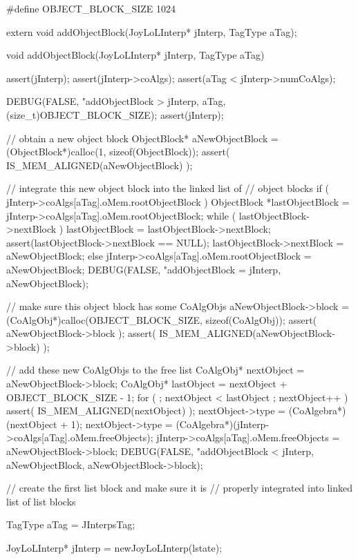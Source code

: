 \startCHeader
#define OBJECT_BLOCK_SIZE 1024

extern void addObjectBlock(JoyLoLInterp* jInterp, TagType aTag);
\stopCHeader


\startCCode
void addObjectBlock(JoyLoLInterp* jInterp, TagType aTag) {
  assert(jInterp);
  assert(jInterp->coAlgs);
  assert(aTag < jInterp->numCoAlgs);

  DEBUG(FALSE, "addObjectBlock > %
    jInterp, aTag, (size_t)OBJECT_BLOCK_SIZE);
  assert(jInterp);
  
  // obtain a new object block
  ObjectBlock* aNewObjectBlock = 
    (ObjectBlock*)calloc(1, sizeof(ObjectBlock));
  assert( IS_MEM_ALIGNED(aNewObjectBlock) );

  // integrate this new object block into the linked list of
  // object blocks
  if ( jInterp->coAlgs[aTag].oMem.rootObjectBlock ) {
    ObjectBlock *lastObjectBlock = jInterp->coAlgs[aTag].oMem.rootObjectBlock;
    while ( lastObjectBlock->nextBlock ) {
      lastObjectBlock = lastObjectBlock->nextBlock;
    }
    assert(lastObjectBlock->nextBlock == NULL);
    lastObjectBlock->nextBlock = aNewObjectBlock;
  } else {
    jInterp->coAlgs[aTag].oMem.rootObjectBlock = aNewObjectBlock;
  }
  DEBUG(FALSE, "addObjectBlock = %
    jInterp, aNewObjectBlock);

  // make sure this object block has some CoAlgObjs
  aNewObjectBlock->block = 
    (CoAlgObj*)calloc(OBJECT_BLOCK_SIZE, sizeof(CoAlgObj));
  assert( aNewObjectBlock->block );
  assert( IS_MEM_ALIGNED(aNewObjectBlock->block) );

  // add these new CoAlgObjs to the free list
  CoAlgObj* nextObject = aNewObjectBlock->block;
  CoAlgObj* lastObject = nextObject + OBJECT_BLOCK_SIZE - 1;
  for ( ; nextObject < lastObject ; nextObject++ ) {
    assert( IS_MEM_ALIGNED(nextObject) );
    nextObject->type = (CoAlgebra*)(nextObject + 1);
  }
  nextObject->type = (CoAlgebra*)(jInterp->coAlgs[aTag].oMem.freeObjects);
  jInterp->coAlgs[aTag].oMem.freeObjects = aNewObjectBlock->block;
  DEBUG(FALSE, "addObjectBlock < %
    jInterp, aNewObjectBlock, aNewObjectBlock->block);
}
\stopCCode

\startCTest
  // create the first list block and make sure it is 
  // properly integrated into linked list of list blocks

  TagType aTag = JInterpsTag;
  
  JoyLoLInterp* jInterp = newJoyLoLInterp(lstate);
  
